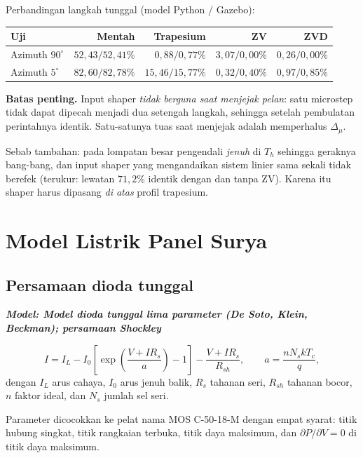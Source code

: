 \documentclass[11pt,a4paper]{article}
\newcommand{\degg}{^\circ}
\newcommand{\model}[1]{\textbf{\textit{Model: #1}}}
\begin{document}
Perbandingan langkah tunggal (model Python / Gazebo):

\begin{longtable}{l r r r r}
\toprule
\textbf{Uji} & \textbf{Mentah} & \textbf{Trapesium} & \textbf{ZV} & \textbf{ZVD} \\
\midrule
Azimuth $90\degg$ & $52{,}43 / 52{,}41\%$ & $0{,}88 / 0{,}77\%$ & $3{,}07 / 0{,}00\%$ & $0{,}26 / 0{,}00\%$ \\
Azimuth $5\degg$ & $82{,}60 / 82{,}78\%$ & $15{,}46 / 15{,}77\%$ & $0{,}32 / 0{,}40\%$ & $0{,}97 / 0{,}85\%$ \\
\bottomrule
\end{longtable}

\textbf{Batas penting.} Input shaper \emph{tidak berguna saat menjejak pelan}: satu microstep tidak dapat
dipecah menjadi dua setengah langkah, sehingga setelah pembulatan perintahnya identik. Satu-satunya tuas
saat menjejak adalah memperhalus $\Delta_\mu$.

Sebab tambahan: pada lompatan besar pengendali \emph{jenuh} di $T_h$ sehingga geraknya bang-bang, dan
input shaper yang mengandaikan sistem linier sama sekali tidak berefek (terukur: lewatan $71{,}2\%$ identik
dengan dan tanpa ZV). Karena itu shaper harus dipasang \emph{di atas} profil trapesium.

\section{Model Listrik Panel Surya}
\label{sec:arus}

\subsection{Persamaan dioda tunggal}

\model{Model dioda tunggal lima parameter (De Soto, Klein, Beckman); persamaan Shockley}

\begin{equation}
I = I_L - I_0\left[ \exp\!\left( \frac{V + I R_s}{a} \right) - 1 \right] - \frac{V + I R_s}{R_{sh}},
\qquad a = \frac{n N_s k T_c}{q},
\label{eq:diode}
\end{equation}
dengan $I_L$ arus cahaya, $I_0$ arus jenuh balik, $R_s$ tahanan seri, $R_{sh}$ tahanan bocor, $n$ faktor
ideal, dan $N_s$ jumlah sel seri.

Parameter dicocokkan ke pelat nama MOS C-50-18-M dengan empat syarat: titik hubung singkat, titik rangkaian
terbuka, titik daya maksimum, dan $\partial P/\partial V = 0$ di titik daya maksimum.
\end{document}
